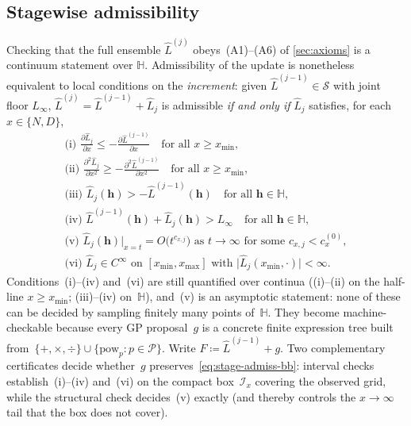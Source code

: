\documentclass[11pt]{article}
\newcommand{\calS}{\mathcal{S}}
\newcommand{\calI}{\mathcal{I}}
\newcommand{\calP}{\mathcal{P}}
\newcommand{\bbH}{\mathbb{H}}
\newcommand{\Lhat}{\hat{L}}
\begin{document}
\subsection{Stagewise admissibility}\label{sec:stage-admiss}\label{sec:certificates}
Checking that the full ensemble $\Lhat^{(j)}$ obeys~(A1)--(A6) of \cref{sec:axioms} is a continuum statement over $\bbH$. Admissibility of the update is nonetheless equivalent to local conditions on the \emph{increment}: given $\Lhat^{(j-1)} \in \calS$ with joint floor $L_\infty$, $\Lhat^{(j)} = \Lhat^{(j-1)} + \Lhat_j$ is admissible \emph{if and only if} $\Lhat_j$ satisfies, for each $x \in \{N,D\}$,
\begin{equation}\label{eq:stage-admiss-bb}
\begin{gathered}
\text{(i) } \frac{\partial \Lhat_j}{\partial x}
   \leq -\frac{\partial \Lhat^{(j-1)}}{\partial x}
   \quad\text{for all } x \geq x_{\min},
\\[2pt]
\text{(ii) } \frac{\partial^2 \Lhat_j}{\partial x^2}
   \geq -\frac{\partial^2 \Lhat^{(j-1)}}{\partial x^2}
   \quad\text{for all } x \geq x_{\min},
\\[2pt]
\text{(iii) } \Lhat_j(\mathbf{h}) > -\Lhat^{(j-1)}(\mathbf{h})
   \quad\text{for all } \mathbf{h} \in \bbH,
\\[2pt]
\text{(iv) } \Lhat^{(j-1)}(\mathbf{h}) + \Lhat_j(\mathbf{h}) > L_\infty
   \quad\text{for all } \mathbf{h} \in \bbH,
\\[2pt]
\text{(v) } \Lhat_j(\mathbf{h})\big|_{x=t} = O\bigl(t^{c_{x,j}}\bigr)
   \text{ as } t \to \infty
   \text{ for some } c_{x,j} < c_x^{(0)},
\\[2pt]
\text{(vi) } \Lhat_j \in C^\infty
   \text{ on } [x_{\min}, x_{\max}]
   \text{ with }
   \bigl|\Lhat_j(x_{\min}, \cdot)\bigr| < \infty.
\end{gathered}
\end{equation}
Conditions~(i)--(iv) and~(vi) are still quantified over continua ((i)--(ii) on the half-line $x\geq x_{\min}$; (iii)--(iv) on~$\bbH$), and~(v) is an asymptotic statement: none of these can be decided by sampling finitely many points of~$\bbH$.
They become machine-checkable because every GP proposal~$g$ is a concrete finite expression tree built from~$\{+,\times,\div\}\cup\{\mathrm{pow}_p:p\in\calP\}$. Write $F \coloneqq \Lhat^{(j-1)} + g$. Two complementary certificates decide whether~$g$ preserves~\eqref{eq:stage-admiss-bb}: interval checks establish~(i)--(iv) and~(vi) on the compact box~$\calI_x$ covering the observed grid, while the structural check decides~(v) exactly (and thereby controls the $x\to\infty$ tail that the box does not cover).
\end{document}
